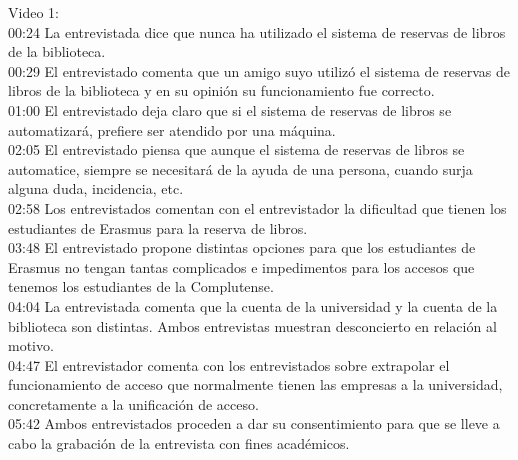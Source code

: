 \documentclass[12pt]{article}
\begin{document}
Video 1: \\
00:24 La entrevistada dice que nunca ha utilizado el sistema de reservas de libros de la biblioteca.\\
00:29 El entrevistado comenta que un amigo suyo utilizó el sistema de reservas de libros de la biblioteca y en su opinión su funcionamiento fue correcto.\\
01:00 El entrevistado deja claro que si el sistema de reservas de libros se automatizará, prefiere ser atendido por una máquina.\\
02:05 El entrevistado piensa que aunque el sistema de reservas de libros se automatice, siempre se necesitará de la ayuda de una persona, cuando surja alguna duda, incidencia, etc.\\
02:58 Los entrevistados comentan con el entrevistador la dificultad que tienen los estudiantes de Erasmus para la reserva de libros.\\
03:48 El entrevistado propone distintas opciones para que los estudiantes de Erasmus no tengan tantas complicados e impedimentos para los accesos que tenemos los estudiantes de la Complutense. \\
04:04 La entrevistada comenta que la cuenta de la universidad y la cuenta de la biblioteca son distintas. Ambos entrevistas muestran desconcierto en relación al motivo.\\
04:47 El entrevistador comenta con los entrevistados sobre extrapolar el funcionamiento de acceso que normalmente tienen las empresas a la universidad, concretamente a la unificación de acceso.\\
05:42 Ambos entrevistados proceden a dar su consentimiento para que se lleve a cabo la grabación de la entrevista con fines académicos.  \\
\end{document}
